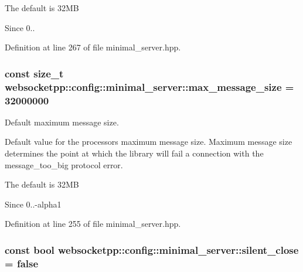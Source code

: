 The default is 32\+M\+B

\begin{DoxySince}{Since}
0.. 
\end{DoxySince}


Definition at line 267 of file minimal\+\_\+server.\+hpp.

\hypertarget{structwebsocketpp_1_1config_1_1minimal__server_adfad5099419b8e2090c3667d17e10008}{}
\subsubsection[{max\+\_\+message\+\_\+size}]{\setlength{\rightskip}{0pt plus 5cm}const size\+\_\+t websocketpp\+::config\+::minimal\+\_\+server\+::max\+\_\+message\+\_\+size = 32000000\hspace{0.3cm}{\ttfamily [static]}}\label{structwebsocketpp_1_1config_1_1minimal__server_adfad5099419b8e2090c3667d17e10008}


Default maximum message size. 

Default value for the processor\textquotesingle{}s maximum message size. Maximum message size determines the point at which the library will fail a connection with the message\+\_\+too\+\_\+big protocol error.

The default is 32\+M\+B

\begin{DoxySince}{Since}
0..-\/alpha1 
\end{DoxySince}


Definition at line 255 of file minimal\+\_\+server.\+hpp.

\hypertarget{structwebsocketpp_1_1config_1_1minimal__server_a2628ceea7ff3671afac22317f979e9c1}{}
\subsubsection[{silent\+\_\+close}]{\setlength{\rightskip}{0pt plus 5cm}const bool websocketpp\+::config\+::minimal\+\_\+server\+::silent\+\_\+close = false\hspace{0.3cm}{\ttfamily [static]}}\label{structwebsocketpp_1_1config_1_1minimal__server_a2628ceea7ff3671afac22317f979e9c1}


